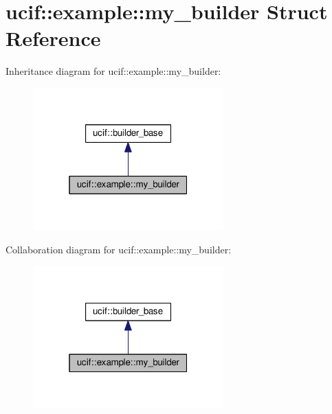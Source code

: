 \hypertarget{structucif_1_1example_1_1my__builder}{\section{ucif\-:\-:example\-:\-:my\-\_\-builder Struct Reference}
\label{structucif_1_1example_1_1my__builder}
}


Inheritance diagram for ucif\-:\-:example\-:\-:my\-\_\-builder\-:
\nopagebreak
\begin{figure}[H]
\begin{center}
\leavevmode
\includegraphics[width=208pt]{structucif_1_1example_1_1my__builder__inherit__graph}
\end{center}
\end{figure}


Collaboration diagram for ucif\-:\-:example\-:\-:my\-\_\-builder\-:
\nopagebreak
\begin{figure}[H]
\begin{center}
\leavevmode
\includegraphics[width=208pt]{structucif_1_1example_1_1my__builder__coll__graph}
\end{center}
\end{figure}
